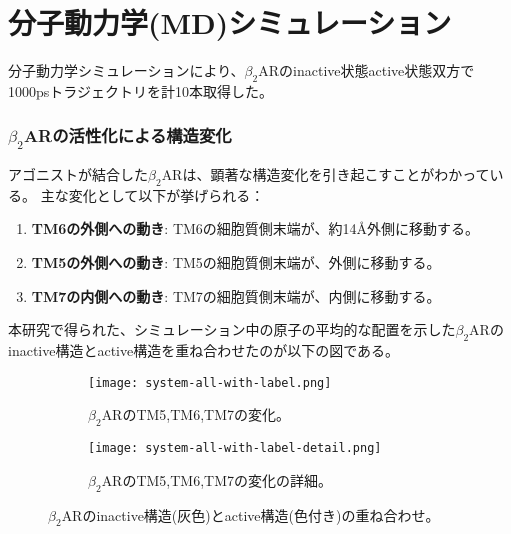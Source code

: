 \section{分子動力学(MD)シミュレーション}

分子動力学シミュレーションにより、$\beta_2$ARのinactive状態active状態双方で1000psトラジェクトリを計10本取得した。

\subsubsection{$\beta_2$ARの活性化による構造変化}
アゴニストが結合した$\beta_2$ARは、顕著な構造変化を引き起こす\cite{rasmussen2011crystal}\cite{poudel2021activation}ことがわかっている。
主な変化として以下が挙げられる：
\begin{enumerate}
    \item \textbf{TM6の外側への動き}: TM6の細胞質側末端が、約14Å外側に移動する。
    \item \textbf{TM5の外側への動き}: TM5の細胞質側末端が、外側に移動する。
    \item \textbf{TM7の内側への動き}: TM7の細胞質側末端が、内側に移動する。
\end{enumerate}

本研究で得られた、シミュレーション中の原子の平均的な配置を示した$\beta_2$ARのinactive構造とactive構造を重ね合わせたのが以下の図である。
\begin{figure}[htbp]
  \centering
  \begin{subfigure}{1.00\textwidth} %
    \centering
    \texttt{[image: system-all-with-label.png]}
    \caption{$\beta_2$ARのTM5,TM6,TM7の変化。}
    \label{fig:fitting_TM}
  \end{subfigure}
  \hspace{0.02\textwidth} %
  \begin{subfigure}{0.88\textwidth}
    \centering
    \texttt{[image: system-all-with-label-detail.png]}
    \caption{$\beta_2$ARのTM5,TM6,TM7の変化の詳細。}
    \label{fig:fitting_TM_detail}
  \end{subfigure}
  \caption{$\beta_2$ARのinactive構造(灰色)とactive構造(色付き)の重ね合わせ。}
  \label{fig:fitting-all}
\end{figure}


